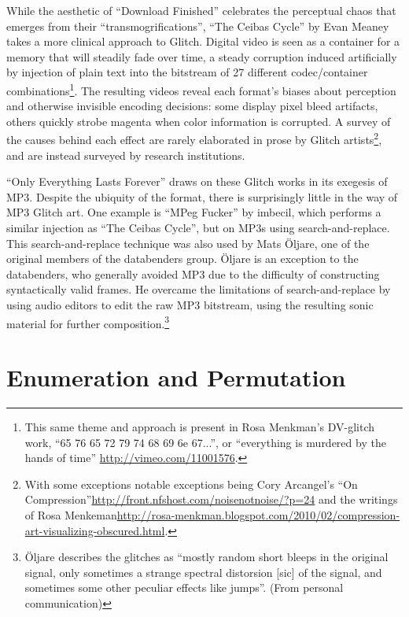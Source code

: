 \documentclass{thesis}
\begin{document}
While the aesthetic of ``Download Finished'' celebrates the perceptual chaos that emerges from their ``transmogrifications'', ``The Ceibas Cycle'' by Evan Meaney\cite{evan_meaney_ceibas:_2008} takes a more clinical approach to Glitch. Digital video is seen as a container for a memory that will steadily fade over time, a steady corruption induced artificially by injection of plain text into the bitstream of 27 different codec/container combinations\footnote{This same theme and approach is present in Rosa Menkman's DV-glitch work, ``65 76 65 72 79 74 68 69 6e 67...'', or ``everything is murdered by the hands of time'' \url{http://vimeo.com/11001576}.}. The resulting videos reveal each format's biases about perception and otherwise invisible encoding decisions: some display pixel bleed artifacts, others quickly strobe magenta when color information is corrupted. A survey of the causes behind each effect are rarely elaborated in prose by Glitch artists\footnote{With some exceptions notable exceptions being Cory Arcangel's ``On Compression''\url{http://front.nfshost.com/noisenotnoise/?p=24} and the writings of Rosa Menkeman\url{http://rosa-menkman.blogspot.com/2010/02/compression-art-visualizing-obscured.html}.}, and are instead surveyed by research institutions\cite{nikolai_trunichkin_and_dr._dmitriy_vatolin_crazy_????}.

``Only Everything Lasts Forever'' draws on these Glitch works in its exegesis of MP3. Despite the ubiquity of the format, there is surprisingly little in the way of MP3 Glitch art. One example is ``MPeg Fucker'' by imbecil\cite{imbecil_mpeg_2004}, which performs a similar injection as ``The Ceibas Cycle'', but on MP3s using search-and-replace. This search-and-replace technique was also used by Mats \"Oljare, one of the original members of the databenders group. \"Oljare is an exception to the databenders, who generally avoided MP3 due to the difficulty of constructing syntactically valid frames. He overcame the limitations of search-and-replace by using audio editors to edit the raw MP3 bitstream, using the resulting sonic material for further composition.\footnote{\"Oljare describes the glitches as ``mostly random short bleeps in the original signal, only sometimes a strange spectral distorsion [sic] of the signal, and sometimes some other peculiar effects like jumps''. (From personal communication)}

\section{Enumeration and Permutation}
	
\end{document}

